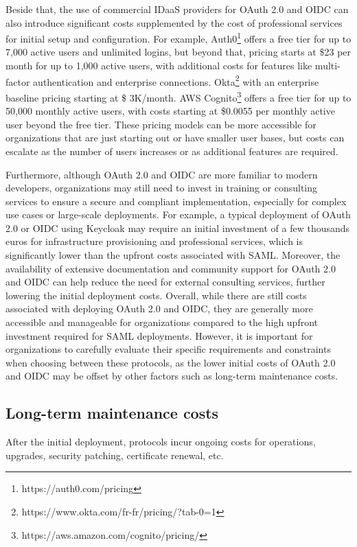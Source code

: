 \documentclass[../memoire.tex]{subfiles}
\begin{document}
Beside that, the use of commercial IDaaS providers for OAuth 2.0 and OIDC can also introduce significant costs supplemented by the cost of professional services for initial setup and configuration. For example, Auth0\footnote{https://auth0.com/pricing} offers a free tier for up to 7,000 active users and unlimited logins, but beyond that, pricing starts at \$23 per month for up to 1,000 active users, with additional costs for features like multi-factor authentication and enterprise connections. Okta\footnote{https://www.okta.com/fr-fr/pricing/?tab-0=1} with an enterprise baseline pricing starting at \$ 3K/month. AWS Cognito\footnote{https://aws.amazon.com/cognito/pricing/} offers a free tier for up to 50,000 monthly active users, with costs starting at \$0.0055 per monthly active user beyond the free tier. These pricing models can be more accessible for organizations that are just starting out or have smaller user bases, but costs can escalate as the number of users increases or as additional features are required. 

Furthermore, although OAuth 2.0 and OIDC are more familiar to modern developers, organizations may still need to invest in training or consulting services to ensure a secure and compliant implementation, especially for complex use cases or large-scale deployments. For example, a typical deployment of OAuth 2.0 or OIDC using Keycloak may require an initial investment of a few thousands euros for infrastructure provisioning and professional services, which is significantly lower than the upfront costs associated with SAML. Moreover, the availability of extensive documentation and community support for OAuth 2.0 and OIDC can help reduce the need for external consulting services, further lowering the initial deployment costs. Overall, while there are still costs associated with deploying OAuth 2.0 and OIDC, they are generally more accessible and manageable for organizations compared to the high upfront investment required for SAML deployments. However, it is important for organizations to carefully evaluate their specific requirements and constraints when choosing between these protocols, as the lower initial costs of OAuth 2.0 and OIDC may be offset by other factors such as long-term maintenance costs.

\subsection{Long-term maintenance costs}

After the initial deployment, protocols incur ongoing costs for operations, upgrades, security patching, certificate renewal, etc. 
\end{document}
